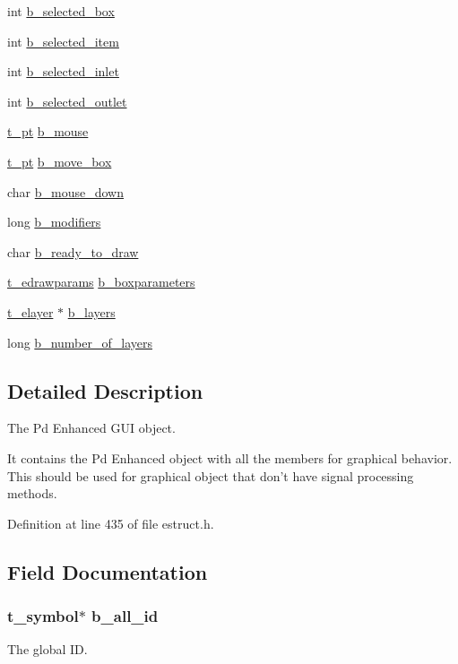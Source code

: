 \begin{DoxyCompactItemize}
int \hyperlink{struct__ebox_acc1a127070b19ccf6e222d7349c84c96}{b\-\_\-selected\-\_\-box}
\item 
int \hyperlink{struct__ebox_a1f65b6d093e53fd85bed085ce0c5dd8e}{b\-\_\-selected\-\_\-item}
\item 
int \hyperlink{struct__ebox_a0cebb4789c213079e0490e86c10c2893}{b\-\_\-selected\-\_\-inlet}
\item 
int \hyperlink{struct__ebox_acbf0482cb9c6e192e2059775acc1ac86}{b\-\_\-selected\-\_\-outlet}
\item 
\hyperlink{struct__pt}{t\-\_\-pt} \hyperlink{struct__ebox_a8831d355ec1dbb2dca9a68268a977965}{b\-\_\-mouse}
\item 
\hyperlink{struct__pt}{t\-\_\-pt} \hyperlink{struct__ebox_a2b028829ae54f8ccede6bb0d5903f7fd}{b\-\_\-move\-\_\-box}
\item 
char \hyperlink{struct__ebox_a1dc439a4d35e98f78370c81ceadc8ea0}{b\-\_\-mouse\-\_\-down}
\item 
long \hyperlink{struct__ebox_ad230697acdd2d00abb2dc18dd38089d8}{b\-\_\-modifiers}
\item 
char \hyperlink{struct__ebox_a234ea03e103bd45f5fa1d27b8e69b5dd}{b\-\_\-ready\-\_\-to\-\_\-draw}
\item 
\hyperlink{struct__edrawparams}{t\-\_\-edrawparams} \hyperlink{struct__ebox_a01fa53a36dc717c81755d805a868ad9d}{b\-\_\-boxparameters}
\item 
\hyperlink{struct__elayer}{t\-\_\-elayer} $\ast$ \hyperlink{struct__ebox_ad80949f483467d74761a9e321300d64e}{b\-\_\-layers}
\item 
long \hyperlink{struct__ebox_a84105957ca11a224cf734f350fb23ac9}{b\-\_\-number\-\_\-of\-\_\-layers}
\end{DoxyCompactItemize}


\subsection{Detailed Description}
The Pd Enhanced G\-U\-I object. 

It contains the Pd Enhanced object with all the members for graphical behavior. This should be used for graphical object that don't have signal processing methods. 

Definition at line 435 of file estruct.\-h.



\subsection{Field Documentation}
\hypertarget{struct__ebox_a0f63dcf604135dd4fbfbf43eaed53c1a}{
\subsubsection[{b\-\_\-all\-\_\-id}]{\setlength{\rightskip}{0pt plus 5cm}t\-\_\-symbol$\ast$ b\-\_\-all\-\_\-id}}\label{struct__ebox_a0f63dcf604135dd4fbfbf43eaed53c1a}
The global I\-D. 

